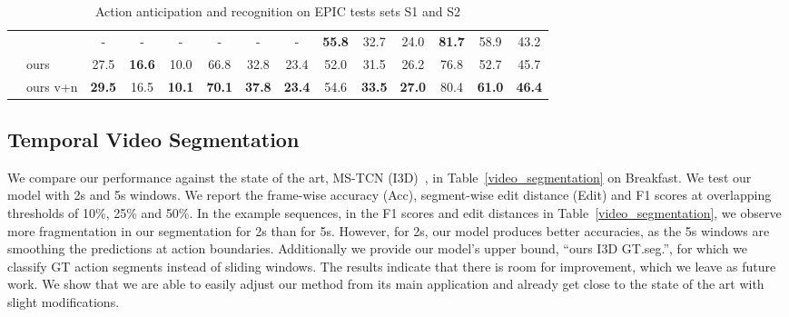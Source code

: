 \documentclass[runningheads]{llncs}
\begin{document}
\begin{table}[t]
{\begin{tabular}{|clccc|ccc|ccc|ccc|}
&\cite{xiao2020audiovisual} & - & - & - & - & - & - & \textbf{55.8} & {32.7} & 24.0 & \textbf{81.7} & {58.9} & 43.2 \\\rowcolor{blue!10}
& ours & {27.5} & \textbf{16.6} & {10.0} & 66.8 & 32.8 & {23.4} & 52.0 & 31.5 & {26.2} & 76.8 & 52.7 & {45.7} \\\rowcolor{blue!10}
& ours v+n & \textbf{29.5} & 16.5 & \textbf{10.1} & \textbf{70.1} & \textbf{37.8} & \textbf{23.4} & 54.6 & \textbf{33.5} & \textbf{27.0} & 80.4 & \textbf{61.0} & \textbf{46.4}\\ \hline
\end{tabular}}
\caption{Action anticipation and recognition on EPIC tests sets S1 and S2} 
\label{tab:epic_ex_test}
\end{table} 


\subsection{Temporal Video Segmentation}\label{sec:video_seg}
We compare our performance against the state of the art, MS-TCN (I3D)~\cite{farha2019ms}, in Table~\ref{video_segmentation} on Breakfast. We test our model with 2s and 5s windows. We report the frame-wise accuracy (Acc), segment-wise edit distance (Edit) and F1 scores at overlapping thresholds of 10\%, 25\% and 50\%. In the example sequences, in the F1 scores and edit distances in Table~\ref{video_segmentation}, we observe more fragmentation in our segmentation for 2s than for 5s. However, for 2s, our model produces better accuracies, as the 5s windows are smoothing the predictions at action boundaries. Additionally we provide our model's upper bound, ``ours I3D GT.seg.'', for which we classify GT action segments instead of sliding windows. The results indicate that there is room for improvement, which we leave as future work. We show that we are able to easily adjust our method from its main application and already get close to the state of the art with slight modifications. 
 
\end{document}

